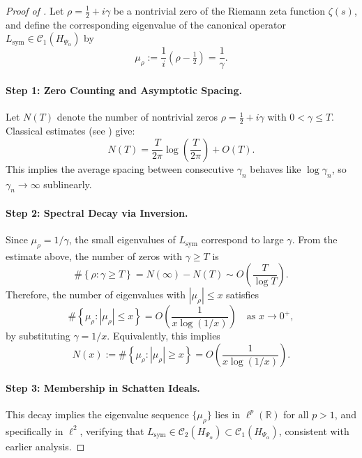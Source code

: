 \begin{proof}[Proof of ]
Let \( \rho = \tfrac{1}{2} + i\gamma \) be a nontrivial zero of the Riemann zeta function \( \zeta(s) \), and define the corresponding eigenvalue of the canonical operator \( L_{\mathrm{sym}} \in \mathcal{C}_1(H_{\Psi_\alpha}) \) by
\[
\mu_\rho := \frac{1}{i}(\rho - \tfrac{1}{2}) = \frac{1}{\gamma}.
\]

\paragraph{Step 1: Zero Counting and Asymptotic Spacing.}
Let \( N(T) \) denote the number of nontrivial zeros \( \rho = \tfrac{1}{2} + i\gamma \) with \( 0 < \gamma \leq T \). Classical estimates (see \cite{Titchmarsh1986Zeta}) give:
\[
N(T) = \frac{T}{2\pi} \log \left( \frac{T}{2\pi} \right) + O(T).
\]
This implies the average spacing between consecutive \( \gamma_n \) behaves like \( \log \gamma_n \), so \( \gamma_n \to \infty \) sublinearly.

\paragraph{Step 2: Spectral Decay via Inversion.}
Since \( \mu_\rho = 1/\gamma \), the small eigenvalues of \( L_{\mathrm{sym}} \) correspond to large \( \gamma \). From the estimate above, the number of zeros with \( \gamma \geq T \) is
\[
\#\left\{ \rho : \gamma \geq T \right\} = N(\infty) - N(T) \sim O\left( \frac{T}{\log T} \right).
\]
Therefore, the number of eigenvalues with \( |\mu_\rho| \leq x \) satisfies
\[
\#\left\{ \mu_\rho : |\mu_\rho| \leq x \right\} = O\left( \frac{1}{x \log(1/x)} \right)
\quad \text{as } x \to 0^+,
\]
by substituting \( \gamma = 1/x \). Equivalently, this implies
\[
N(x) := \#\left\{ \mu_\rho : |\mu_\rho| \geq x \right\} = O\left( \frac{1}{x \log(1/x)} \right).
\]

\paragraph{Step 3: Membership in Schatten Ideals.}
This decay implies the eigenvalue sequence \( \{ \mu_\rho \} \) lies in \( \ell^p(\mathbb{R}) \) for all \( p > 1 \), and specifically in \( \ell^2 \), verifying that \( L_{\mathrm{sym}} \in \mathcal{C}_2(H_{\Psi_\alpha}) \subset \mathcal{C}_1(H_{\Psi_\alpha}) \), consistent with earlier analysis.
\end{proof}
